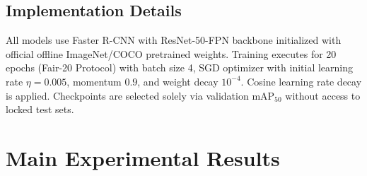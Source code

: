 \documentclass[10pt,twocolumn]{article}
\begin{document}
\subsection{Implementation Details}
All models use Faster R-CNN with ResNet-50-FPN backbone initialized with official offline ImageNet/COCO pretrained weights. Training executes for 20 epochs (Fair-20 Protocol) with batch size 4, SGD optimizer with initial learning rate $\eta = 0.005$, momentum $0.9$, and weight decay $10^{-4}$. Cosine learning rate decay is applied. Checkpoints are selected solely via validation $\text{mAP}_{50}$ without access to locked test sets.

\section{Main Experimental Results}
\end{document}
